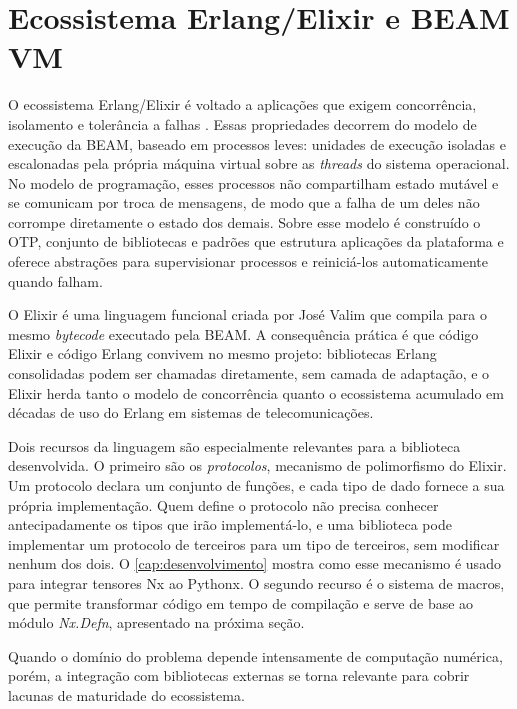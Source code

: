\section{Ecossistema Erlang/Elixir e BEAM VM}\label{sec:ecossistema-erlang-elixir}

O ecossistema Erlang/Elixir é voltado a aplicações que exigem concorrência, isolamento e tolerância a falhas \citep{armstrong2010}. Essas propriedades decorrem do modelo de execução da \gls{BEAM}, baseado em processos leves: unidades de execução isoladas e escalonadas pela própria máquina virtual sobre as \textit{threads} do sistema operacional. No modelo de programação, esses processos não compartilham estado mutável e se comunicam por troca de mensagens, de modo que a falha de um deles não corrompe diretamente o estado dos demais. Sobre esse modelo é construído o \gls{OTP}, conjunto de bibliotecas e padrões que estrutura aplicações da plataforma e oferece abstrações para supervisionar processos e reiniciá-los automaticamente quando falham.

O Elixir \citep{elixir2024} é uma linguagem funcional criada por José Valim que compila para o mesmo \textit{bytecode} executado pela \gls{BEAM}. A consequência prática é que código Elixir e código Erlang convivem no mesmo projeto: bibliotecas Erlang consolidadas podem ser chamadas diretamente, sem camada de adaptação, e o Elixir herda tanto o modelo de concorrência quanto o ecossistema acumulado em décadas de uso do Erlang em sistemas de telecomunicações.

Dois recursos da linguagem são especialmente relevantes para a biblioteca desenvolvida. O primeiro são os \textit{protocolos}, mecanismo de polimorfismo do Elixir. Um protocolo declara um conjunto de funções, e cada tipo de dado fornece a sua própria implementação. Quem define o protocolo não precisa conhecer antecipadamente os tipos que irão implementá-lo, e uma biblioteca pode implementar um protocolo de terceiros para um tipo de terceiros, sem modificar nenhum dos dois. O \autoref{cap:desenvolvimento} mostra como esse mecanismo é usado para integrar tensores \gls{Nx} ao Pythonx. O segundo recurso é o sistema de macros, que permite transformar código em tempo de compilação e serve de base ao módulo \textit{Nx.Defn}, apresentado na próxima seção.

Quando o domínio do problema depende intensamente de computação numérica, porém, a integração com bibliotecas externas se torna relevante para cobrir lacunas de maturidade do ecossistema.

